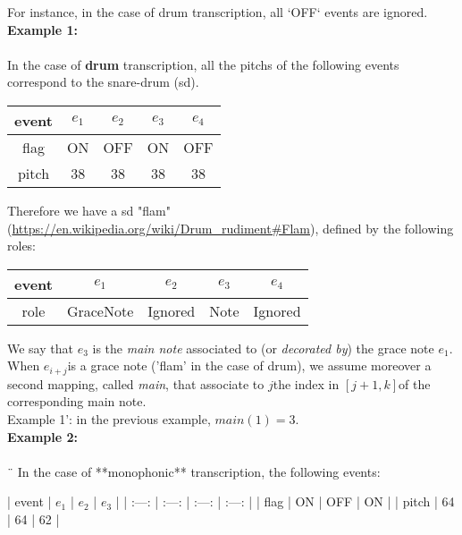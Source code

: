 For instance, in the case of drum transcription, all `OFF` events are ignored.\\

\textbf{Example 1:}\\\\
In the case of \textbf{drum} transcription, all the pitchs of the following events correspond to the snare-drum (sd).

\begin{table}[h]
\centering
\begin{tabular}{|c|c|c|c|c|}\hline
	event & $e_1$ & $e_2$ & $e_3$ & $e_4$ \\ \hline
	flag & ON & OFF & ON & OFF \\
	pitch & 38 & 38 & 38 & 38 \\ \hline
\end{tabular}	
\end{table}

Therefore we have a sd "flam" (\url{https://en.wikipedia.org/wiki/Drum\_rudiment#Flam}), defined by the following roles:

\begin{table}[h]
	\centering
	\begin{tabular}{|c|c|c|c|c|}\hline
		event & $e_1$ & $e_2$ & $e_3$ & $e_4$ \\ \hline
		role  & GraceNote & Ignored & Note  & Ignored \\ \hline
	\end{tabular}	
\end{table}

We say that $e_3$ is the \textit{main note} associated to (or \textit{decorated by}) the grace note $e_1$.\\

When $e_{i+j}$​ is a grace note ('flam' in the case of drum), we assume moreover a second mapping, called \textit{main}, that associate to $j$​  the index in $[j+1, k]$​ of the corresponding main note.\\

Example 1': in the previous example, $main(1) = 3$.\\



\textbf{Example 2:}\\\\¨
In the case of **monophonic** transcription, the following events: 

| event | $e_1$ | $e_2$ | $e_3$ |
| :---: | :---: | :---: | :---: |
| flag  |  ON   |  OFF  |  ON   |
| pitch |  64   |  64   |  62   |

